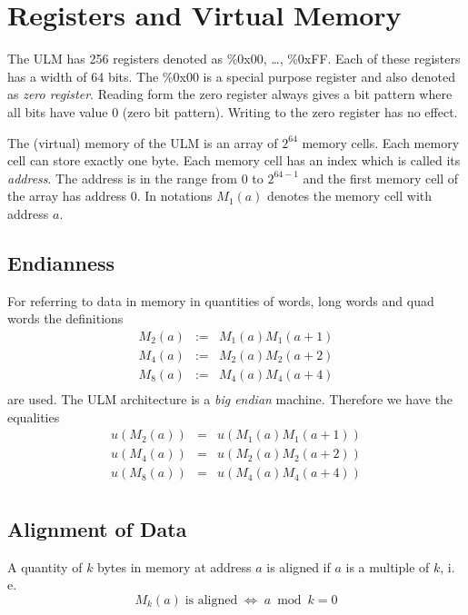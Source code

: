 \documentclass[
   a4paper,
   twoside,
   bringhurst,
   palatino,
   english,
   titlepage,
   fleqn
]{refman}
\begin{document}
    \section{Registers and Virtual Memory}

    The ULM has 256 registers denoted as \%0x00, \dots, \%0xFF. Each of these
    registers has a width of 64 bits. The \%0x00 is a special purpose register
    and also denoted as \textit{zero register}. Reading form the zero register
    always gives a bit pattern where all bits have value 0 (zero bit pattern).
    Writing to the zero register has no effect.


    The (virtual) memory of the ULM is an array of $2^{64}$ memory cells. Each
    memory cell can store exactly one byte. Each memory cell has an index which
    is called its \textit{address}. The address is in the range from $0$ to
    $2^{64-1}$ and the first memory cell of the array has address $0$. In
    notations $M_1(a)$ denotes the memory cell with address $a$.


    \subsection{Endianness}

    For referring to data in memory in quantities of words, long words and quad
    words the definitions
    \[
	\begin{array}{lcl}
	M_2(a) & := & M_1(a) M_1(a+1) \\
	M_4(a) & := & M_2(a) M_2(a+2) \\
	M_8(a) & := & M_4(a) M_4(a+4) \\
	\end{array}
    \]
    are used. The ULM architecture is a \textit{big endian} machine. Therefore
    we have the equalities
    \[
	\begin{array}{lcl}
	u(M_2(a)) & = & u(M_1(a) M_1(a+1)) \\
	u(M_4(a)) & = & u(M_2(a) M_2(a+2)) \\
	u(M_8(a)) & = & u(M_4(a) M_4(a+4)) \\
	\end{array}
    \]


    \subsection{Alignment of Data}

    A quantity of $k$ bytes in memory at address $a$ is aligned if $a$ is a
    multiple of $k$, i.\,e.
    \[
	M_k(a)\;\text{is aligned}\;\Leftrightarrow\; a \bmod k = 0
    \]
\end{document}
